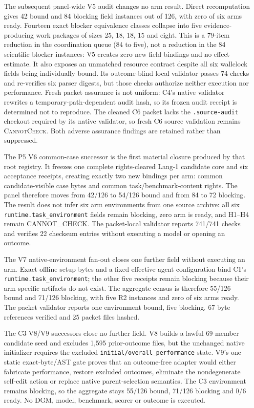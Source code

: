 The subsequent panel-wide V5 audit changes no arm result. Direct recomputation
gives 42 bound and 84 blocking field instances out of 126, with zero of six
arms ready. Fourteen exact blocker equivalence classes collapse into five
evidence-producing work packages of sizes 25, 18, 18, 15 and eight. This is a
79-item reduction in the coordination queue (84 to five), not a reduction in
the 84 scientific blocker instances: V5 creates zero new field bindings and no
effect estimate. It also exposes an unmatched resource contract despite all
six wallclock fields being individually bound. Its outcome-blind local
validator passes 74 checks and re-verifies six parser digests, but those checks
authorize neither execution nor performance. Fresh packet assurance is not
uniform: C4's native validator rewrites a temporary-path-dependent audit hash,
so its frozen audit receipt is determined not to reproduce. The cleaned C6
packet lacks the \texttt{.source-audit} checkout required by its native
validator, so fresh C6 source validation remains \textsc{CannotCheck}. Both
adverse assurance findings are retained rather than suppressed.

The P5 V6 common-case successor is the first material closure produced by that
root registry. It freezes one complete rights-cleared Lang-1 candidate core and
six acceptance receipts, creating exactly two new bindings per arm: common
candidate-visible case bytes and common task/benchmark-content rights. The
panel therefore moves from 42/126 to 54/126 bound and from 84 to 72 blocking.
The result does not infer six arm environments from one source archive: all six
\texttt{runtime.task\_environment} fields remain blocking, zero arm is ready,
and H1--H4 remain \textsf{CANNOT\_CHECK}. The packet-local validator reports
741/741 checks and verifies 22 checksum entries without executing a model or
opening an outcome.

The V7 native-environment fan-out closes one further field without executing
an arm. Exact offline setup bytes and a fixed effective agent configuration
bind C1's \texttt{runtime.task\_environment}; the other five receipts remain
blocking because their arm-specific artifacts do not exist. The aggregate
census is therefore 55/126 bound and 71/126 blocking, with five R2 instances
and zero of six arms ready. The packet validator reports one environment bound,
five blocking, 67 byte references verified and 25 packet files hashed.

The C3 V8/V9 successors close no further field. V8 builds a lawful 69-member
candidate seed and excludes 1,595 prior-outcome files, but the unchanged native
initializer requires the excluded \texttt{initial/overall\_performance} state.
V9's one static exact-byte/AST gate proves that an outcome-free adapter would
either fabricate performance, restore excluded outcomes, eliminate the
nondegenerate self-edit action or replace native parent-selection semantics.
The C3 environment remains blocking, so the aggregate stays 55/126 bound,
71/126 blocking and 0/6 ready. No DGM, model, benchmark, scorer or outcome is
executed.

